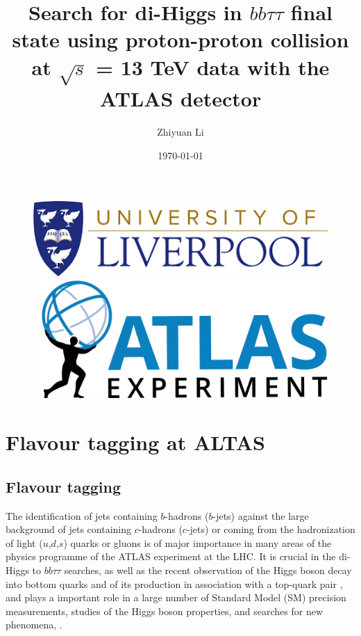 \documentclass[letterpaper,12pt]{article}
\begin{document}
\title{Search for di-Higgs in $bb\tau\tau$ final state using proton-proton collision at $\sqrt{s}$ = 13 TeV data with the ATLAS detector}%
\author{ Zhiyuan Li}
\date{\today}
\maketitle
\begin{figure}[htp]
\begin{minipage}[b]{.5\textwidth}
\centering
\includegraphics[width=1\textwidth]{logo.png}
\end{minipage}\hfill
\begin{minipage}[b]{.45\textwidth}
\vspace{3em}
\centering
\includegraphics[width=1\textwidth]{ATLAS-Logo-Ref-RGB-H_1.jpg}
\end{minipage}
\end{figure}
\newpage


\tableofcontents{}
\printindex{}


\newpage
\section{Flavour tagging at ALTAS}


\subsection{Flavour tagging}


The identification of jets containing $b$-hadrons ($b$-jets) against the large background of jets containing $c$-hadrons ($c$-jets) or coming from the hadronization of light ($u$,$d$,$s$) quarks or gluons is of major importance in many areas of the physics programme of the ATLAS experiment at the LHC. It is crucial in the di-Higgs to $bb\tau\tau$ searches, as well as the recent observation of the Higgs boson decay into bottom quarks \cite{HIGG-2018-04} and of its production in association with a top-quark pair \cite{HIGG-2018-13}, and plays a important role in a large number of Standard Model (SM) precision measurements, studies of the Higgs boson properties, and searches for new phenomena\cite{SUSY-2014-08}, \cite{ATLAS-CONF-2018-043} \cite{Interpreting Higgs result}.
\end{document}

